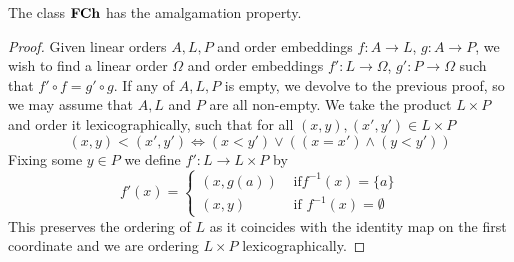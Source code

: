 \begin{prop}
  The class $\textbf{FCh}$ has the amalgamation property.
\end{prop}
\begin{proof}
  Given linear orders $A,L,P$ and order embeddings $f : A \to L$, $g : A \to P$, we wish to
  find a linear order $\Omega$ and order embeddings $f' : L \to \Omega$, $g' : P \to \Omega$ such
  that $f' \circ f = g' \circ g$. If any of $A,L,P$ is empty, we devolve to the previous proof,
  so we may assume that $A,L$ and $P$ are all non-empty. We take the product $L \times P$ and
  order it lexicographically, such that for all $(x,y), (x',y') \in L \times P$
  \begin{equation*}
    (x,y) < (x',y') \iff (x < y') \lor ((x = x') \land (y < y'))
  \end{equation*}
  Fixing some $y \in P$ we define $f' : L \to L \times P$ by
  \begin{equation*}
    f'(x) = \begin{cases}
      (x, g(a)) & \text{ if} f^{-1}(x) = \{a\} \\
      (x, y)    & \text{ if } f^{-1}(x) = \emptyset
    \end{cases}
  \end{equation*}
  This preserves the ordering of $L$ as it coincides with the identity map on the first coordinate
  and we are ordering $L \times P$ lexicographically.


\end{proof}
